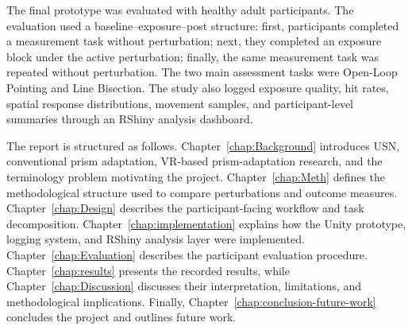 The final prototype was evaluated with healthy adult participants. The evaluation used a baseline--exposure--post structure: first, participants completed a measurement task without perturbation; next, they completed an exposure block under the active perturbation; finally, the same measurement task was repeated without perturbation. The two main assessment tasks were Open-Loop Pointing and Line Bisection. The study also logged exposure quality, hit rates, spatial response distributions, movement samples, and participant-level summaries through an RShiny analysis dashboard.

The report is structured as follows. Chapter~\ref{chap:Background} introduces USN, conventional prism adaptation, VR-based prism-adaptation research, and the terminology problem motivating the project. Chapter~\ref{chap:Meth} defines the methodological structure used to compare perturbations and outcome measures. Chapter~\ref{chap:Design} describes the participant-facing workflow and task decomposition. Chapter~\ref{chap:implementation} explains how the Unity prototype, logging system, and RShiny analysis layer were implemented. Chapter~\ref{chap:Evaluation} describes the participant evaluation procedure. Chapter~\ref{chap:results} presents the recorded results, while Chapter~\ref{chap:Discussion} discusses their interpretation, limitations, and methodological implications. Finally, Chapter~\ref{chap:conclusion-future-work} concludes the project and outlines future work.
